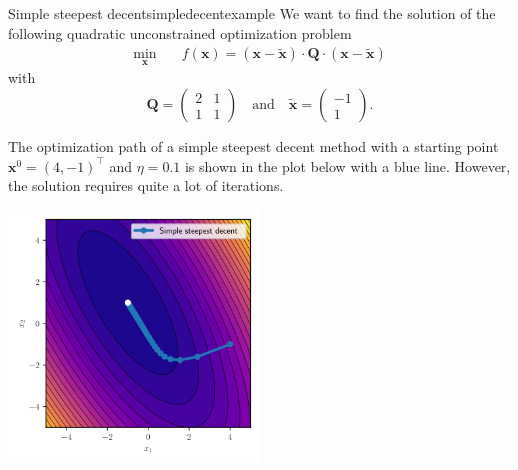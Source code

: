 \begin{example}{Simple steepest decent}{simpledecentexample}
    We want to find the solution of the following quadratic unconstrained optimization problem
    \begin{equation}
        \begin{aligned}
            \min_{\mathbf{x}} \quad & f(\mathbf{x})= (\mathbf{x}-\tilde{\mathbf{x}}) \cdot \mathbf{Q} \cdot (\mathbf{x}-\tilde{\mathbf{x}})
        \end{aligned}
        \label{eq:simpledecent_example}
    \end{equation}
    with 
    \begin{equation}
        \mathbf{Q} = 
        \begin{pmatrix}
        2 & 1 \\
        1 & 1 
        \end{pmatrix}
        \quad \text{and} \quad
        \tilde{\mathbf{x}} = 
        \begin{pmatrix}
        -1\\
        1 
        \end{pmatrix}
        .
    \end{equation}

    The optimization path of a simple steepest decent method with a starting point $\mathbf{x}^0= (4, -1)^\top$ and $\eta=0.1$ is shown in the plot below with a blue line. However, the solution requires quite a lot of iterations.

    \begin{center}
        \includegraphics[width=0.5\textwidth]{figures/simple_decent.svg}
    \end{center}   
\end{example}

